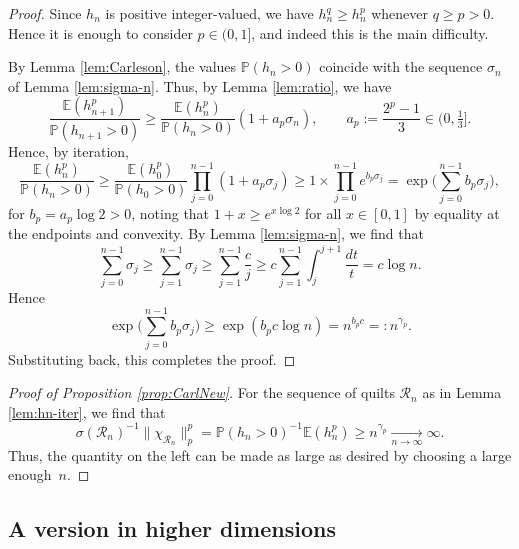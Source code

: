 \documentclass[11pt, reqno]{amsart}
\theoremstyle{definition}
\theoremstyle{remark}
\numberwithin{equation}{section}
\newcommand{\E}{\mathbb E}
\renewcommand{\P}{\mathbb P}
\newcommand{\Norm}[2]{\|#1\|_{#2}}
\begin{document}
\begin{proof}
Since $h_n$ is positive integer-valued, we have $h_n^q\geq h_n^p$ whenever $q\geq p>0$. Hence it is enough to consider $p\in(0,1]$, and indeed this is the main difficulty.

By Lemma \ref{lem:Carleson}, the values $\P(h_n>0)$ coincide with the sequence $\sigma_n$ of Lemma \ref{lem:sigma-n}. Thus, by Lemma \ref{lem:ratio}, we have
\begin{equation*}
  \frac{\E(h_{n+1}^p)}{\P(h_{n+1}>0)}
  \geq\frac{\E(h_{n}^p)}{\P(h_{n}>0)}(1+a_p\sigma_n),\qquad a_p:=\frac{2^p-1}{3}\in(0,\tfrac13].
\end{equation*}
Hence, by iteration,
\begin{equation*}
  \frac{\E(h_{n}^p)}{\P(h_{n}>0)}
  \geq\frac{\E(h_{0}^p)}{\P(h_{0}>0)}\prod_{j=0}^{n-1}(1+a_p\sigma_j)
  \geq 1\times\prod_{j=0}^{n-1}e^{b_p\sigma_j}
  =\exp\Big(\sum_{j=0}^{n-1}b_p\sigma_j\Big),
\end{equation*}
for $b_p=a_p\log 2>0$, noting that $1+x\geq e^{x\log 2}$ for all $x\in[0,1]$ by equality at the endpoints and convexity. By Lemma \ref{lem:sigma-n}, we find that
\begin{equation*}
  \sum_{j=0}^{n-1}\sigma_j\geq \sum_{j=1}^{n-1}\sigma_j
  \geq \sum_{j=1}^{n-1}\frac{c}{j}
  \geq c\sum_{j=1}^{n-1}\int_j^{j+1}\frac{dt}{t}=c\log n.
\end{equation*}
Hence
\begin{equation*}
  \exp\Big(\sum_{j=0}^{n-1}b_p\sigma_j\Big)
  \geq\exp(b_p c\log n)=n^{b_p c}=:n^{\gamma_p}.
\end{equation*}
Substituting back, this completes the proof.
\end{proof}

\begin{proof}[Proof of Proposition \ref{prop:CarlNew}]
For the sequence of quilts $\mathscr R_n$ as in Lemma \ref{lem:hn-iter}, we find that
\begin{equation*}
   \sigma(\mathscr R_n)^{-1}\Norm{\chi_{\mathscr R_n}}{p}^p
   =\P(h_n>0)^{-1}\E(h_n^p)\geq n^{\gamma_p}\underset{n\to\infty}{\longrightarrow}\infty.
\end{equation*}
Thus, the quantity on the left can be made as large as desired by choosing a large enough~$n$.
\end{proof}

\subsection{A version in higher dimensions}
\end{document}
